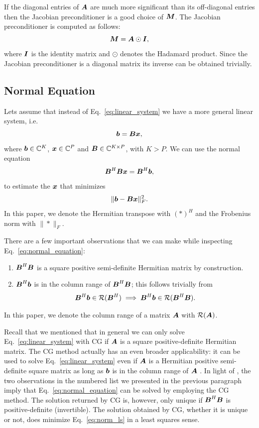 \documentclass[useAMS,usenatbib]{mn2e}
\newcommand{\bA}{\bmath{A}}
\newcommand{\bB}{\bmath{B}}
\newcommand{\bM}{\bmath{M}}
\newcommand{\bI}{\bmath{I}}
\newcommand{\bb}{\bmath{b}}
\newcommand{\bx}{\bmath{x}}
\begin{document}
If the diagonal entries of $\bA$ are much more significant than its off-diagonal entries then the 
Jacobian preconditioner is a good choice of $\bM$. The Jacobian preconditioner is computed as follows:
\begin{equation}
\bM = \bA\odot\bI, 
\end{equation}
where $\bI$ is the identity matrix and $\odot$ denotes the Hadamard product. Since the Jacobian preconditioner is a diagonal matrix its inverse can be obtained trivially.

\subsection{Normal Equation}
\label{sec:normal}
Lets assume that instead of Eq.~\eqref{eq:linear_system} we have a more general linear system, i.e.
\begin{equation}
 \bb = \bB\bx,
\end{equation}
where $\bb\in\mathbb{C}^K$, $\bx\in\mathbb{C}^P$  and $\bB\in\mathbb{C}^{K \times P}$, with $K > P$. We can use the normal equation 
\begin{equation}
\label{eq:normal_equation}
\bB^H\bB\bx = \bB^H\bb, 
\end{equation}
to estimate the $\bx$ that minimizes
\begin{equation}
\label{eq:norm_ls}
\|\bb-\bB\bx\|_F^2. 
\end{equation}
In this paper, we denote the Hermitian transpose with $(*)^H$ and the Frobenius norm with $\|*\|_F$.

There are a few important observations that we can make while inspecting Eq.~\eqref{eq:normal_equation}:
\begin{enumerate}
\item $\bB^H\bB$ is a square positive semi-definite Hermitian matrix by construction.
\item $\bB^H\bb$ is in the column range of $\bB^H\bB$; this follows trivially from 
\begin{equation}
\bB^H\bb \in \mathcal{R}(\bB^H) \implies \bB^H\bb \in \mathcal{R}(\bB^H\bB).   
\end{equation}
\end{enumerate}
In this paper, we denote the column range of a matrix $\bA$ with $\mathcal{R}(\bA)$.

Recall that we mentioned that in general we can only solve Eq.~\eqref{eq:linear_system} with CG if $\bA$ is a square positive-definite Hermitian matrix. The CG method actually has an even broader applicability: it can be used to solve Eq.~\eqref{eq:linear_system} even if $\bA$ is a Hermitian positive semi-definite
square matrix as long as $\bb$ is in the column range of $\bA$ \citep{Lu2015}. In light of \citet{Lu2015}, the two observations in the numbered list we presented in the previous paragraph imply that Eq.~\eqref{eq:normal_equation}
can be solved by employing the CG method. The solution returned by CG is, however, only unique if $\bB^H\bB$ is positive-definite (invertible). The solution
obtained by CG, whether it is unique or not, does minimize Eq.~\eqref{eq:norm_ls} in a least squares sense.
\end{document}
